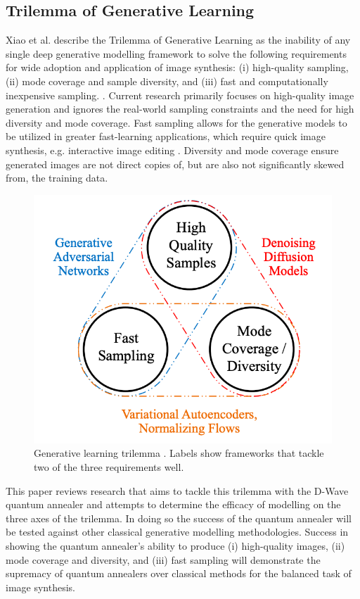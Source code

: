 \documentclass[%
 reprint,
 amsmath,amssymb,
 aps,
]{revtex4-2}
\begin{document}
\subsection{Trilemma of Generative Learning}
\label{trilemmaGL}
Xiao et al. describe the Trilemma of Generative Learning as the inability of any single deep generative modelling framework to solve the following requirements for wide adoption and application of image synthesis: (i) high-quality sampling, (ii) mode coverage and sample diversity, and (iii) fast and computationally inexpensive sampling. \cite{xiao2022DDGAN}. Current research primarily focuses on high-quality image generation and ignores the real-world sampling constraints and the need for high diversity and mode coverage. Fast sampling allows for the generative models to be utilized in greater fast-learning applications, which require quick image synthesis, e.g. interactive image editing \cite{xiao2022DDGAN}. Diversity and mode coverage ensure generated images are not direct copies of, but are also not significantly skewed from, the training data.

\begin{figure}[h]
\includegraphics[width=0.9\columnwidth]{trilemma.png}%
\caption{\label{fig:trilemma} Generative learning trilemma \cite{xiao2022DDGAN}. Labels show frameworks that tackle two of the three requirements well.}
\end{figure}

This paper reviews research that aims to tackle this trilemma with the D-Wave quantum annealer and attempts to determine the efficacy of modelling on the three axes of the trilemma. In doing so the success of the quantum annealer will be tested against other classical generative modelling methodologies. Success in showing the quantum annealer's ability to produce (i) high-quality images, (ii) mode coverage and diversity, and (iii) fast sampling will demonstrate the supremacy of quantum annealers over classical methods for the balanced task of image synthesis.
\end{document}
